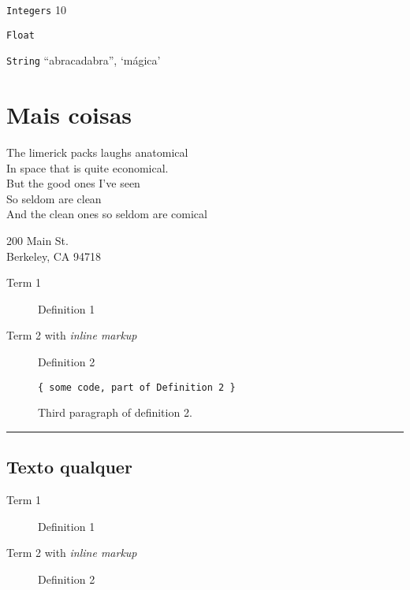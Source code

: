 \documentclass{article}
\begin{document}
\begin{multicols*}{4}
\texttt{Integers} \hfill 10

\texttt{Float} 

\texttt{String} \hrulefill ``abracadabra'', `mágica'


\section{Mais coisas}

The limerick packs laughs anatomical\\
In space that is quite economical.\\
\hspace*{0.333em}\hspace*{0.333em}\hspace*{0.333em}But the good ones
I've seen\\
\hspace*{0.333em}\hspace*{0.333em}\hspace*{0.333em}So seldom are clean\\
And the clean ones so seldom are comical

200 Main St.\\
Berkeley, CA 94718


\begin{description}
\item[Term 1]
Definition 1
\item[Term 2 with \emph{inline markup}]
Definition 2

\begin{verbatim}
{ some code, part of Definition 2 }
\end{verbatim}

Third paragraph of definition 2.
\end{description}

\begin{center}\rule{0.5\linewidth}{\linethickness}\end{center}


\subsectionfont{\color{red}}

\subsection{Texto qualquer}

\color{DarkRed}

\begin{description}
\item[Term 1]
Definition 1
\item[Term 2 with \emph{inline markup}]
Definition 2


\end{description}
\end{multicols*}
\end{document}
